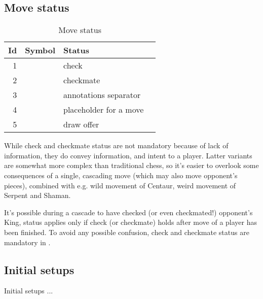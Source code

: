 \clearpage %

\subsection*{Move status}
\label{sec:Appendix/Summary/Move status}

\begin{table}[!h]
\centering
\begin{tabular}{ rlll }
\toprule
\textbf{Id} & \textbf{Symbol}      & \textbf{Status}                \\
\midrule
1           & \alg{+}              & check                          \\
2           & \alg{\#}             & checkmate                      \\ \cmidrule{1-3}
3           & \alg{\_}             & annotations separator          \\
4           & \alg{...}            & placeholder for a move         \\
5           & \alg{(=)}            & draw offer                     \\
\bottomrule
\end{tabular}
\caption{Move status}
\label{tbl:Appendix/Summary/Move status}
\end{table}

While check and checkmate status are not mandatory because of lack of information,
they do convey information, and intent to a player. Latter variants are somewhat more
complex than traditional chess, so it's easier to overlook some consequences of a
single, cascading move (which may also move opponent's pieces), combined with e.g.
wild movement of Centaur, weird movement of Serpent and Shaman.

It's possible during a cascade to have checked (or even checkmated!) opponent's King,
status applies only if check (or checkmate) holds after move of a player has been
finished. To avoid any possible confusion, check and checkmate status are mandatory
in .

\clearpage %

\subsection*{Initial setups}
\label{sec:Appendix/Summary/Initial setups}
Initial setups ...

